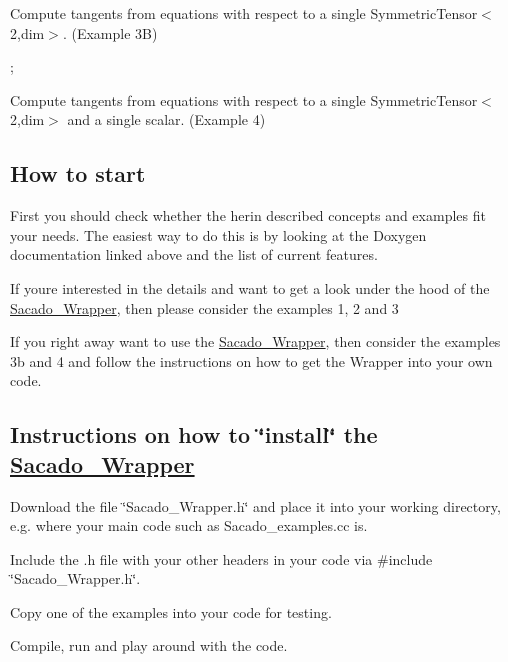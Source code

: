 \begin{DoxyItemize}
\item Compute tangents from equations with respect to a single Symmetric\+Tensor$<$2,dim$>$. (Example 3B)

\href{https://www.codecogs.com/eqnedit.php?latex=\boldsymbol{B}&space;=&space;\frac{\partial{\phi}}{\partial\boldsymbol{\varepsilon&space;}}}{\tt } ; \href{https://www.codecogs.com/eqnedit.php?latex=\overset{4}{C}&space;=&space;\frac{\partial\boldsymbol{\sigma}}{\partial\boldsymbol{\varepsilon&space;}}}{\tt }
\item Compute tangents from equations with respect to a single Symmetric\+Tensor$<$2,dim$>$ and a single scalar. (Example 4)
\end{DoxyItemize}

\href{https://www.codecogs.com/eqnedit.php?latex=\boldsymbol{A,&space;B,&space;}&space;\overset{4}{C}&space;\textrm{&space;and&space;}&space;$D$&space;\textrm{&space;at&space;the&space;same&space;time}}{\tt }

\subsection*{How to start}


\begin{DoxyItemize}
\item First you should check whether the herin described concepts and examples fit your needs. The easiest way to do this is by looking at the Doxygen documentation linked above and the list of current features.
\item If you\textquotesingle{}re interested in the details and want to get a look under the hood of the \hyperlink{namespaceSacado__Wrapper}{Sacado\+\_\+\+Wrapper}, then please consider the examples 1, 2 and 3
\item If you right away want to use the \hyperlink{namespaceSacado__Wrapper}{Sacado\+\_\+\+Wrapper}, then consider the examples 3b and 4 and follow the instructions on how to get the Wrapper into your own code.
\end{DoxyItemize}

\subsection*{Instructions on how to \char`\"{}install\char`\"{} the \hyperlink{namespaceSacado__Wrapper}{Sacado\+\_\+\+Wrapper}}


\begin{DoxyEnumerate}
\item Download the file \char`\"{}\+Sacado\+\_\+\+Wrapper.\+h\char`\"{} and place it into your working directory, e.\+g. where your main code such as Sacado\+\_\+examples.\+cc is.
\item Include the .h file with your other headers in your code via \textquotesingle{}\#include \char`\"{}\+Sacado\+\_\+\+Wrapper.\+h\char`\"{}\textquotesingle{}.
\item Copy one of the examples into your code for testing.
\item Compile, run and play around with the code.
\end{DoxyEnumerate}

